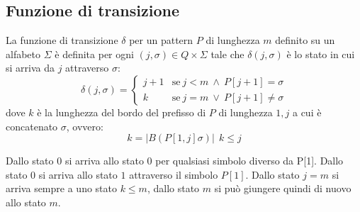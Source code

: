 \subsection{Funzione di transizione}
La funzione di transizione $\delta$ per un pattern $P$ di lunghezza $m$ definito
su un alfabeto $\Sigma$ è definita per ogni $(j, \sigma) \in Q \times \Sigma$ tale
che $\delta(j, \sigma)$ è lo stato in cui si arriva da $j$ attraverso $\sigma$:
\begin{equation}
    \delta(j, \sigma) = \begin{cases}
        j + 1 & \text{se} \ j < m \ \land \ P[j + 1] = \sigma   \\
        k     & \text{se} \ j = m \ \lor \ P[j + 1] \neq \sigma
    \end{cases}
\end{equation}
dove $k$ è la lunghezza del bordo del prefisso di $P$ di lunghezza $1, j$ a cui
è concatenato $\sigma$, ovvero:
\begin{equation}
    k = |B(P[1, j]\sigma)| \ \ k \leq j
\end{equation}

Dallo stato $0$ si arriva allo stato $0$ per qualsiasi simbolo diverso da P[1].
Dallo stato $0$ si arriva allo stato $1$ attraverso il simbolo $P[1]$. Dallo stato
$j = m$ si arriva sempre a uno stato $k \leq m$, dallo stato $m$ si può giungere
quindi di nuovo allo stato $m$.
